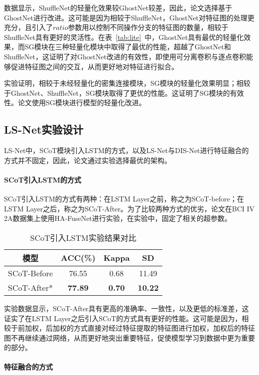 数据显示，ShuffleNet的轻量化效果较GhostNet较差，因此，论文选择基于GhostNet进行改进。这可能是因为相较于ShuffleNet，GhostNet对特征图的处理更充分，且引入了\(ratio\)参数用以控制不同操作分支的特征图的数量，相较于ShuffleNet具有更好的灵活性。在表~\ref{tab:lite}~中，GhostNet具有最优的轻量化效果，而SG模块在三种轻量化模块中取得了最优的性能，超越了GhostNet和ShuffleNet，这证明了对GhostNet改进的有效性，即使用可分离卷积与逐点卷积能够促进特征图之间的交互，从而更好地对特征进行拟合。

实验证明，相较于未经轻量化的密集连接模块，SG模块的轻量化效果明显；相较于GhostNet、ShuffleNet，SG模块取得了更优的性能。这证明了SG模块的有效性。论文使用SG模块进行模型的轻量化改进。

\subsection{LS-Net实验设计}

LS-Net中，SCoT模块引入LSTM的方式，以及LS-Net与DIS-Net进行特征融合的方式并不固定，因此，论文通过实验选择最优的架构。

\paragraph{SCoT引入LSTM的方式}

SCoT引入LSTM的方式有两种：在LSTM Layer之前，称之为SCoT-before；在LSTM Layer之后，称之为SCoT-After。为了比较两种方式的优劣，论文在BCI IV 2A数据集上使用HA-FuseNet进行实验，在实验中，固定了相关的超参数。
\begin{table}[ht]
    \centering
    \caption{SCoT引入LSTM实验结果对比}
    \label{tab:ls}
    \begin{tabularx}{\textwidth}{CCCC}
      \toprule
      模型 & ACC(\%) & Kappa & SD \\
      \midrule
      SCoT-Before & 76.55 & 0.68 & 11.49 \\
      SCoT-After* & \textbf{77.89} & \textbf{0.70} & \textbf{10.22} \\
      \bottomrule
    \end{tabularx}
\end{table}

实验数据显示，SCoT-After具有更高的准确率、一致性，以及更低的标准差，这证实了在LSTM Layer之后引入SCoT的方式具有更好的性能。这可能是因为，相较于前加权，后加权的方式直接对经过特征提取的特征图进行加权，加权后的特征图不再继续通过网络，从而更好地突出重要特征，促使模型学习到数据中更为重要的部分。

\paragraph{特征融合的方式}

